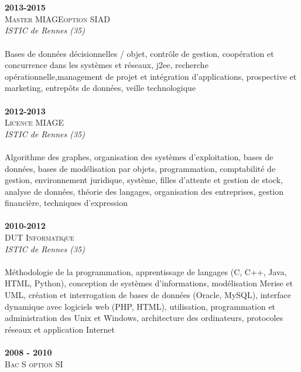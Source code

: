 \begin{titlepage}
\begin{minipage}[t]{8.7cm}
    \\\\
    \textbf{2013-2015} \\
    \textsc{Master MIAGE\footnotemark option SIAD\footnotemark}
    \\\textit{ISTIC de Rennes (35)}
    \\\\Bases de données décisionnelles / objet, contrôle de gestion,
    coopération et concurrence dans les systèmes et réseaux,
    j2ee, recherche opérationnelle,management de
    projet et intégration d'applications, prospective et
    marketing, entrepôts de données, veille technologique
    \\\\\textbf{2012-2013}\\
    \textsc{Licence MIAGE}
    \\\textit{ISTIC de Rennes (35)}
    \\\\Algorithme des graphes, organisation des systèmes d'exploitation,
    bases de données, bases de modélisation par objets, programmation, comptabilité de gestion,
    environnement juridique, système, filles d'attente et
    gestion de stock, analyse de données, théorie des
    langages, organisation des entreprises, gestion financière,
    techniques d'expression
    \\\\\textbf{2010-2012} \\
    \textsc{DUT Informatique}
    \\\textit{ISTIC de Rennes (35)}
    \\\\Méthodologie de la programmation, apprentissage de
    langages (C, C++, Java, HTML, Python), conception de
    systèmes d'informations, modélisation Merise et UML,
    création et interrogation de bases de données (Oracle,
    MySQL), interface dynamique avec logiciels web (PHP,
    HTML), utilisation, programmation et administration des
    Unix et Windows, architecture des ordinateurs,
    protocoles réseaux et application Internet
    \\\\\textbf{2008 - 2010} \\
    \textsc{Bac S option SI\footnotemark}
  \end{minipage}
  \hfill
  \begin{minipage}[t]{8.7cm}


\end{minipage}
\end{titlepage}
